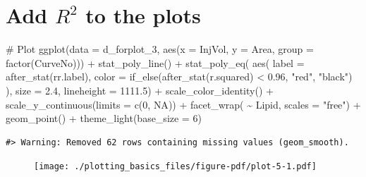 \documentclass[
  letterpaper,
  DIV=11,
  numbers=noendperiod]{scrreprt}
\newenvironment{Shaded}{\begin{snugshade}}{\end{snugshade}}
\newcommand{\AttributeTok}[1]{\textcolor[rgb]{0.40,0.45,0.13}{#1}}
\newcommand{\CommentTok}[1]{\textcolor[rgb]{0.37,0.37,0.37}{#1}}
\newcommand{\ConstantTok}[1]{\textcolor[rgb]{0.56,0.35,0.01}{#1}}
\newcommand{\DecValTok}[1]{\textcolor[rgb]{0.68,0.00,0.00}{#1}}
\newcommand{\FloatTok}[1]{\textcolor[rgb]{0.68,0.00,0.00}{#1}}
\newcommand{\FunctionTok}[1]{\textcolor[rgb]{0.28,0.35,0.67}{#1}}
\newcommand{\NormalTok}[1]{\textcolor[rgb]{0.00,0.23,0.31}{#1}}
\newcommand{\SpecialCharTok}[1]{\textcolor[rgb]{0.37,0.37,0.37}{#1}}
\newcommand{\StringTok}[1]{\textcolor[rgb]{0.13,0.47,0.30}{#1}}
\begin{document}
\hypertarget{add-r2-to-the-plots}{%
\section{\texorpdfstring{Add \(R^2\) to the
plots}{Add R\^{}2 to the plots}}\label{add-r2-to-the-plots}}

\begin{Shaded}
\begin{Highlighting}[]
\CommentTok{\# Plot}
\FunctionTok{ggplot}\NormalTok{(}\AttributeTok{data =}\NormalTok{ d\_forplot\_3, }\FunctionTok{aes}\NormalTok{(}\AttributeTok{x =}\NormalTok{ InjVol, }\AttributeTok{y =}\NormalTok{ Area, }
                               \AttributeTok{group =} \FunctionTok{factor}\NormalTok{(CurveNo))) }\SpecialCharTok{+}
  \FunctionTok{stat\_poly\_line}\NormalTok{() }\SpecialCharTok{+}
  \FunctionTok{stat\_poly\_eq}\NormalTok{(}
    \FunctionTok{aes}\NormalTok{(}
      \AttributeTok{label =} \FunctionTok{after\_stat}\NormalTok{(rr.label),}
      \AttributeTok{color =} \FunctionTok{if\_else}\NormalTok{(}\FunctionTok{after\_stat}\NormalTok{(r.squared) }\SpecialCharTok{\textless{}} \FloatTok{0.96}\NormalTok{, }\StringTok{"red"}\NormalTok{, }\StringTok{"black"}\NormalTok{)}
\NormalTok{    ),}
  \AttributeTok{size =} \FloatTok{2.4}\NormalTok{,}
  \AttributeTok{lineheight =} \FloatTok{1111.5}\NormalTok{) }\SpecialCharTok{+}
  \FunctionTok{scale\_color\_identity}\NormalTok{() }\SpecialCharTok{+}
  \FunctionTok{scale\_y\_continuous}\NormalTok{(}\AttributeTok{limits =} \FunctionTok{c}\NormalTok{(}\DecValTok{0}\NormalTok{, }\ConstantTok{NA}\NormalTok{)) }\SpecialCharTok{+}
  \FunctionTok{facet\_wrap}\NormalTok{( }\SpecialCharTok{\textasciitilde{}}\NormalTok{ Lipid, }\AttributeTok{scales =} \StringTok{"free"}\NormalTok{) }\SpecialCharTok{+}
  \FunctionTok{geom\_point}\NormalTok{() }\SpecialCharTok{+} \FunctionTok{theme\_light}\NormalTok{(}\AttributeTok{base\_size =} \DecValTok{6}\NormalTok{)}
\end{Highlighting}
\end{Shaded}

\begin{verbatim}
#> Warning: Removed 62 rows containing missing values (geom_smooth).
\end{verbatim}

\begin{figure}[H]

{\centering \texttt{[image: ./plotting\_basics\_files/figure-pdf/plot-5-1.pdf]}

}

\end{figure}
\end{document}
